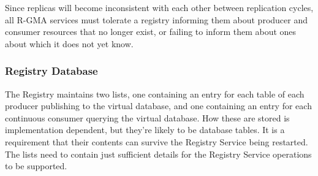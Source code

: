 Since replicas will become inconsistent with each other between
replication cycles, all R-GMA services must tolerate a registry
informing them about producer and consumer resources that no longer
exist, or failing to inform them about ones about which it does not
yet know.

\subsubsection{Registry Database}

The Registry maintains two lists, one containing an entry for each table of
each producer publishing to the virtual database, and one containing an entry
for each continuous consumer querying the virtual database. How these are
stored is implementation dependent, but they're likely to be database tables.
It is a requirement that their contents can survive the Registry
Service being restarted. The lists need to contain just sufficient details
for the Registry Service operations to be supported.
